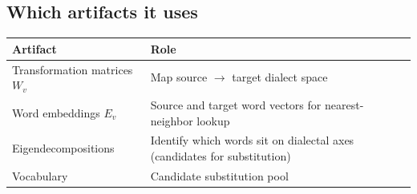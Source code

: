 \documentclass[11pt,a4paper]{article}
\begin{document}
\subsection{Which artifacts it uses}

\begin{center}
\begin{tabular}{ll}
\toprule
\textbf{Artifact} & \textbf{Role} \\
\midrule
Transformation matrices $W_v$ & Map source $\to$ target dialect space \\
Word embeddings $E_v$ & Source and target word vectors for
  nearest-neighbor lookup \\
Eigendecompositions & Identify which words sit on dialectal axes
  (candidates for substitution) \\
Vocabulary & Candidate substitution pool \\
\bottomrule
\end{tabular}
\end{center}
\end{document}

